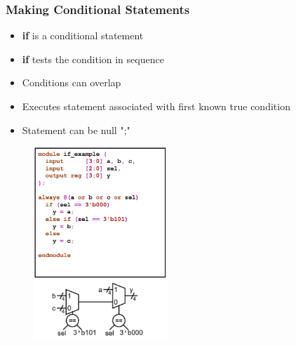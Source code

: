 \documentclass[t, notes, xcolor=table]{beamer}
\begin{document}
\begin{frame}
\frametitle{Making Conditional Statements}
\scriptsize{
\begin{multicols}{2}
\begin{itemize}
\item \textbf{if} is a conditional statement
\item \textbf{if} tests the condition in sequence
\item Conditions can overlap
\item Executes statement associated with first known true condition
\item Statement can be null ";"
\end{itemize}
\vfill
\columnbreak
\begin{figure}
    \includegraphics[width=0.45\textwidth]{img/06_cond.png}
\end{figure}
\end{multicols}
}
\end{frame}
\end{document}

